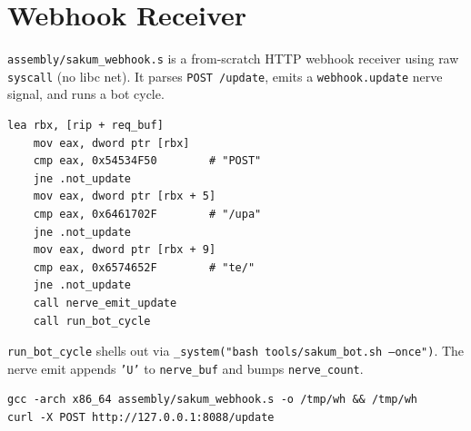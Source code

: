 \section{Webhook Receiver}\label{ch:webhook}

\texttt{assembly/sakum\_webhook.s} is a from-scratch HTTP webhook receiver
using raw \texttt{syscall} (no libc net).  It parses \texttt{POST /update},
emits a \texttt{webhook.update} nerve signal, and runs a bot cycle.

\begin{lstlisting}[language=SakumAsm,caption={POST /update magic-byte parse (sakum\_webhook.s:107).}]
    lea rbx, [rip + req_buf]
    mov eax, dword ptr [rbx]
    cmp eax, 0x54534F50        # "POST"
    jne .not_update
    mov eax, dword ptr [rbx + 5]
    cmp eax, 0x6461702F        # "/upa"
    jne .not_update
    mov eax, dword ptr [rbx + 9]
    cmp eax, 0x6574652F        # "te/"
    jne .not_update
    call nerve_emit_update
    call run_bot_cycle
\end{lstlisting}

\texttt{run\_bot\_cycle} shells out via \texttt{\_system("bash
tools/sakum\_bot.sh --once")}.  The nerve emit appends \texttt{'U'} to
\texttt{nerve\_buf} and bumps \texttt{nerve\_count}.

\begin{verbatim}
gcc -arch x86_64 assembly/sakum_webhook.s -o /tmp/wh && /tmp/wh
curl -X POST http://127.0.0.1:8088/update
\end{verbatim}
